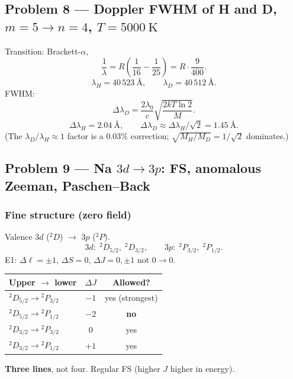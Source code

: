 \documentclass[11pt,a4paper]{article}
\begin{document}
\subsection{Problem 8 --- Doppler FWHM of H and D, \(m=5\to n=4\), \(T=5000~\mathrm{K}\)}
Transition: Brackett-\(\alpha\),
\[
\frac{1}{\lambda}=R\left(\frac{1}{16}-\frac{1}{25}\right)=R\cdot\frac{9}{400}.
\]
\[
\lambda_H=40\,523~\text{\AA},\qquad \lambda_D=40\,512~\text{\AA}.
\]
FWHM:
\[
\Delta\lambda_D=\frac{2\lambda_0}{c}\sqrt{\frac{2kT\ln 2}{M}}.
\]
\[
\Delta\lambda_H=2.04~\text{\AA},\qquad
\Delta\lambda_D\approx\Delta\lambda_H/\sqrt{2}=1.45~\text{\AA}.
\]
(The \(\lambda_D/\lambda_H\approx 1\) factor is a 0.03\% correction; \(\sqrt{M_H/M_D}=1/\sqrt{2}\) dominates.)

\subsection{Problem 9 --- Na \(3d\to 3p\): FS, anomalous Zeeman, Paschen--Back}

\subsubsection*{Fine structure (zero field)}
Valence \(3d\) (\({}^2D\)) \(\to\) \(3p\) (\({}^2P\)).
\[
3d:\;{}^2D_{5/2},\;{}^2D_{3/2},\qquad
3p:\;{}^2P_{3/2},\;{}^2P_{1/2}.
\]
E1: \(\Delta\ell=\pm 1\), \(\Delta S=0\), \(\Delta J=0,\pm 1\) not \(0\to 0\).

\begin{center}
\small
\begin{tabular}{@{}lcc@{}}
\toprule
Upper \(\to\) lower & \(\Delta J\) & Allowed? \\
\midrule
\({}^2D_{5/2}\to{}^2P_{3/2}\) & \(-1\) & yes (strongest) \\
\({}^2D_{5/2}\to{}^2P_{1/2}\) & \(-2\) & \textbf{no} \\
\({}^2D_{3/2}\to{}^2P_{3/2}\) & \(0\) & yes \\
\({}^2D_{3/2}\to{}^2P_{1/2}\) & \(+1\) & yes \\
\bottomrule
\end{tabular}
\end{center}
\textbf{Three lines}, not four. Regular FS (higher \(J\) higher in energy).

\begin{center}
\end{center}
\end{document}
